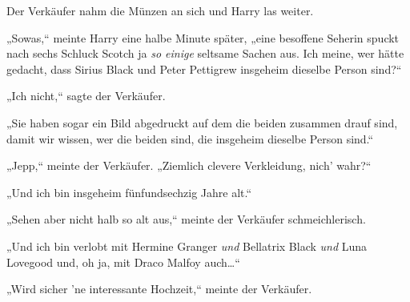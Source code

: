 Der Verkäufer nahm die Münzen an sich und Harry las weiter.

„Sowas,“ meinte Harry eine halbe Minute später, „eine besoffene Seherin spuckt nach sechs Schluck Scotch ja \emph{so einige} seltsame Sachen aus.
Ich meine, wer hätte gedacht, dass Sirius Black und Peter Pettigrew insgeheim dieselbe Person sind?“

„Ich nicht,“ sagte der Verkäufer.

„Sie haben sogar ein Bild abgedruckt auf dem die beiden zusammen drauf sind, damit wir wissen, wer die beiden sind, die insgeheim dieselbe Person sind.“

„Jepp,“ meinte der Verkäufer. „Ziemlich clevere Verkleidung, nich' wahr?“

„Und ich bin insgeheim fünfundsechzig Jahre alt.“

„Sehen aber nicht halb so alt aus,“ meinte der Verkäufer schmeichlerisch.

„Und ich bin verlobt mit Hermine Granger \emph{und} Bellatrix Black \emph{und} Luna Lovegood und, oh ja, mit Draco Malfoy auch…“

„Wird sicher 'ne interessante Hochzeit,“ meinte der Verkäufer.

